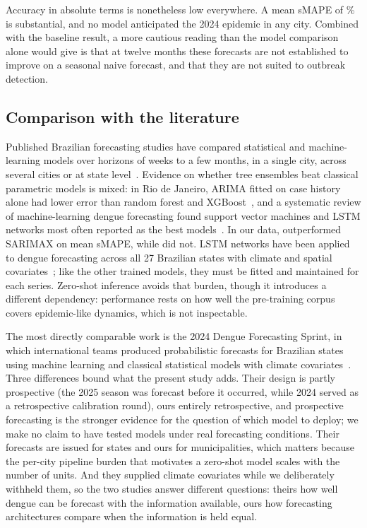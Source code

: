 \documentclass[10pt,letterpaper]{article}
\begin{document}
{Accuracy in absolute terms is nonetheless low everywhere. A mean sMAPE of \% is substantial, and no model anticipated the 2024 epidemic in any city. Combined with the baseline result, a more cautious reading than the model comparison alone would give is that at twelve months these forecasts are not established to improve on a seasonal naive forecast, and that they are not suited to outbreak detection.

\subsection*{Comparison with the literature}

Published Brazilian forecasting studies have compared statistical and machine-learning models over horizons of weeks to a few months, in a single city, across several cities or at state level~\cite{Roster2022,Chen2025rj,Sebastianelli2024}. Evidence on whether tree ensembles beat classical parametric models is mixed: in Rio de Janeiro, ARIMA fitted on case history alone had lower error than random forest and XGBoost~\cite{Chen2025rj}, and a systematic review of machine-learning dengue forecasting found support vector machines and LSTM networks most often reported as the best models~\cite{Fang2024}. In our data,  outperformed SARIMAX on mean sMAPE, while  did not. LSTM networks have been applied to dengue forecasting across all 27 Brazilian states with climate and spatial covariates~\cite{Chen2025lstm}; like the other trained models, they must be fitted and maintained for each series. Zero-shot inference avoids that burden, though it introduces a different dependency: performance rests on how well the pre-training corpus covers epidemic-like dynamics, which is not inspectable.

The most directly comparable work is the 2024 Dengue Forecasting Sprint, in which international teams produced probabilistic forecasts for Brazilian states using machine learning and classical statistical models with climate covariates~\cite{Araujo2026sprint}. Three differences bound what the present study adds. Their design is partly prospective (the 2025 season was forecast before it occurred, while 2024 served as a retrospective calibration round), ours entirely retrospective, and prospective forecasting is the stronger evidence for the question of which model to deploy; we make no claim to have tested models under real forecasting conditions. Their forecasts are issued for states and ours for municipalities, which matters because the per-city pipeline burden that motivates a zero-shot model scales with the number of units. And they supplied climate covariates while we deliberately withheld them, so the two studies answer different questions: theirs how well dengue can be forecast with the information available, ours how forecasting architectures compare when the information is held equal.

}
\end{document}
